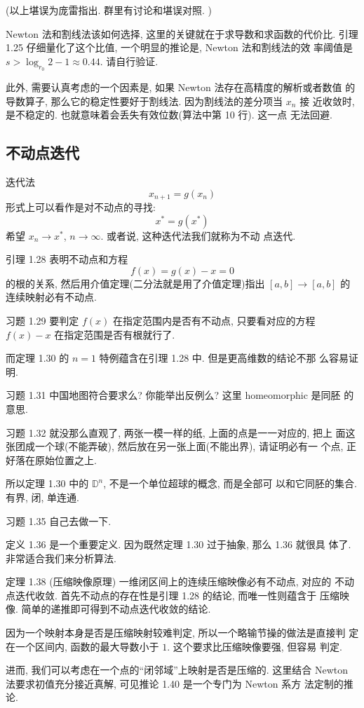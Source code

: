 \documentclass[a4paper]{ctexart}
\begin{document}
(以上堪误为庞雷指出. 群里有讨论和堪误对照. )

Newton 法和割线法该如何选择, 这里的关键就在于求导数和求函数的代价比.
引理 1.25 仔细量化了这个比值, 一个明显的推论是, Newton 法和割线法的效
率阈值是 $s > \log_{r_0}2 - 1 \approx 0.44$. 请自行验证.

此外, 需要认真考虑的一个因素是, 如果 Newton 法存在高精度的解析或者数值
的导数算子, 那么它的稳定性要好于割线法. 因为割线法的差分项当 $x_n$ 接
近收敛时, 是不稳定的. 也就意味着会丢失有效位数(算法中第 10 行). 这一点
无法回避.

\subsection{不动点迭代}
迭代法
$$
x_{n + 1} = g(x_n) 
$$
形式上可以看作是对不动点的寻找:
$$
x^* = g(x^*)
$$希望 $x_n \to x^*$, $n \to \infty$. 或者说, 这种迭代法我们就称为不动
点迭代.

引理 1.28 表明不动点和方程
$$
f(x) = g(x) - x = 0
$$
的根的关系, 然后用介值定理(二分法就是用了介值定理)指出
$[a, b] \to [a, b]$ 的连续映射必有不动点. 

习题 1.29 要判定 $f(x)$ 在指定范围内是否有不动点, 只要看对应的方程
$f(x) - x$ 在指定范围是否有根就行了.

而定理 1.30 的 $n = 1$ 特例蕴含在引理 1.28 中. 但是更高维数的结论不那
么容易证明.

习题 1.31 中国地图符合要求么? 你能举出反例么? 这里 homeomorphic 是同胚
的意思. 

习题 1.32 就没那么直观了, 两张一模一样的纸, 上面的点是一一对应的, 把上
面这张团成一个球(不能弄破), 然后放在另一张上面(不能出界), 请证明必有一
个点, 正好落在原始位置之上.

所以定理 1.30 中的 $\mathbb{D}^n$, 不是一个单位超球的概念, 而是全部可
以和它同胚的集合. 有界, 闭, 单连通. 

习题 1.35 自己去做一下. 

定义 1.36 是一个重要定义. 因为既然定理 1.30 过于抽象, 那么 1.36 就很具
体了. 非常适合我们来分析算法.

定理 1.38 (压缩映像原理) 一维闭区间上的连续压缩映像必有不动点, 对应的
不动点迭代收敛. 首先不动点的存在性是引理 1.28 的结论, 而唯一性则蕴含于
压缩映像. 简单的递推即可得到不动点迭代收敛的结论.

因为一个映射本身是否是压缩映射较难判定, 所以一个略输节操的做法是直接判
定在一个区间内, 函数的最大导数小于 $1$. 这个要求比压缩映像要强, 但容易
判定.

进而, 我们可以考虑在一个点的``闭邻域''上映射是否是压缩的. 这里结合
Newton 法要求初值充分接近真解, 可见推论 1.40 是一个专门为 Newton 系方
法定制的推论.
\end{document}
